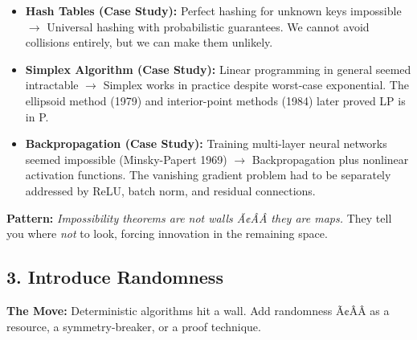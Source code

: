 \begin{itemize}
\item \textbf{Hash Tables (Case Study):} Perfect hashing for unknown keys impossible $\to$ Universal hashing with probabilistic guarantees. We cannot avoid collisions entirely, but we can make them unlikely.

\item \textbf{Simplex Algorithm (Case Study):} Linear programming in general seemed intractable $\to$ Simplex works in practice despite worst-case exponential. The ellipsoid method (1979) and interior-point methods (1984) later proved LP is in P.

\item \textbf{Backpropagation (Case Study):} Training multi-layer neural networks seemed impossible (Minsky-Papert 1969) $\to$ Backpropagation plus nonlinear activation functions. The vanishing gradient problem had to be separately addressed by ReLU, batch norm, and residual connections.
\end{itemize}

\begin{mentalLeap}\textbf{Pattern:} \emph{Impossibility theorems are not walls Ã¢ÂÂ they are maps.} They tell you where \emph{not} to look, forcing innovation in the remaining space.\end{mentalLeap}
\subsection{3. Introduce Randomness}
\label{sec:anatomy:randomness}

\textbf{The Move:} Deterministic algorithms hit a wall. Add randomness Ã¢ÂÂ as a resource, a symmetry-breaker, or a proof technique.

